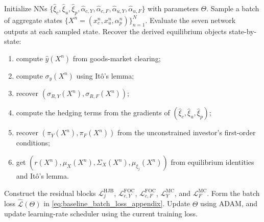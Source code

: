 \begin{algorithm}[!t]
\begin{algorithmic}[1]
\STATE Initialize NNs
$\{\hat\xi_c,\hat\xi_u,\hat\xi_p,\hat\alpha_{c,Y},\hat\alpha_{c,F},\hat\alpha_{u,Y},\hat\alpha_{u,F}\}$
with parameters $\Theta$.
 \STATE Sample a batch of aggregate states $\{X^n=(x_c^n,x_u^n,\alpha_p^n)\}_{n=1}^N$.
 \STATE Evaluate the seven network outputs at each sampled state.
 \STATE Recover the derived equilibrium objects state-by-state:
 \begin{enumerate}[label*=(\alph*)]
 \item compute $\hat y(X^n)$ from goods-market clearing;
 \item compute $\sigma_y(X^n)$ using It\^o's lemma;
 \item recover $(\sigma_{R,Y}(X^n),\sigma_{R,F}(X^n))$;
 \item compute the hedging terms from the gradients of $(\hat\xi_c,\hat\xi_u,\hat\xi_p)$;
 \item recover $(\pi_Y(X^n),\pi_F(X^n))$ from the unconstrained investor's first-order conditions;
 \item get $(r(X^n),\mu_X(X^n),\Sigma_X(X^n),\mu_{\xi_j}(X^n))$ from equilibrium identities and It\^o's lemma.
\end{enumerate}
 \STATE Construct the residual blocks
 $\mathcal L^{\mathrm{HJB}}_j$, $\mathcal L^{\mathrm{FOC}}_{c,Y}$, $\mathcal L^{\mathrm{FOC}}_{c,F}$, $\mathcal L^{\mathrm{MC}}_Y$, and $\mathcal L^{\mathrm{MC}}_F$.
 \STATE Form the batch loss $\widehat{\mathcal L}(\Theta)$ in \eqref{eq:baseline_batch_loss_appendix}.
 \STATE Update $\Theta$ using ADAM, and update learning-rate scheduler using the current training loss.
\ENDFOR
\end{algorithmic}
\caption{First-stage training.}
\label{alg:first_step}
\end{algorithm}



